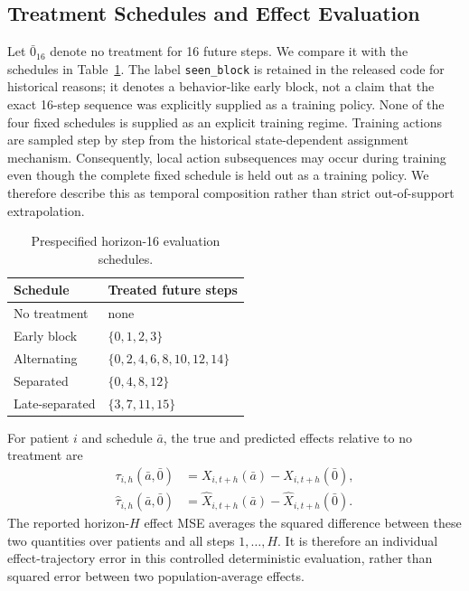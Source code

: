 \subsection{Treatment Schedules and Effect Evaluation}
\label{app:schedules}

Let $\bar 0_{16}$ denote no treatment for 16 future steps. We compare it
with the schedules in Table~\ref{tab:schedules}. The label
\texttt{seen\_block} is retained in the released code for historical
reasons; it denotes a behavior-like early block, not a claim that the
exact 16-step sequence was explicitly supplied as a training policy.
None of the four fixed schedules is supplied as an explicit training
regime. Training actions are sampled step by step from the historical
state-dependent assignment mechanism. Consequently, local action
subsequences may occur during training even though the complete fixed
schedule is held out as a training policy. We therefore describe this as
temporal composition rather than strict out-of-support extrapolation.

\begin{table}[t]
\centering
\caption{Prespecified horizon-16 evaluation schedules.}
\label{tab:schedules}
\begin{tabular}{ll}
\toprule
Schedule & Treated future steps \\
\midrule
No treatment & none \\
Early block & $\{0,1,2,3\}$ \\
Alternating & $\{0,2,4,6,8,10,12,14\}$ \\
Separated & $\{0,4,8,12\}$ \\
Late-separated & $\{3,7,11,15\}$ \\
\bottomrule
\end{tabular}
\end{table}

For patient $i$ and schedule $\bar a$, the true and predicted effects
relative to no treatment are
\begin{align}
    \tau_{i,h}(\bar a,\bar 0)
    &=X_{i,t+h}(\bar a)-X_{i,t+h}(\bar 0),\\
    \widehat\tau_{i,h}(\bar a,\bar 0)
    &=\widehat X_{i,t+h}(\bar a)
      -\widehat X_{i,t+h}(\bar 0).
\end{align}
The reported horizon-$H$ effect MSE averages the squared difference
between these two quantities over patients and all steps $1,\ldots,H$.
It is therefore an individual effect-trajectory error in this controlled
deterministic evaluation, rather than squared error between two
population-average effects.

